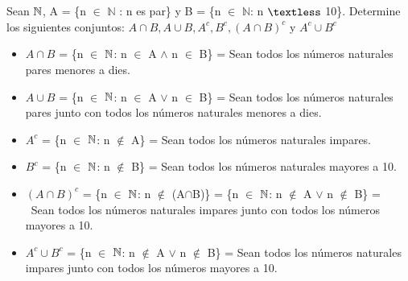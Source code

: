 \section{}
Sean $\mathbb{N}$, A = \{n $\in$ $\mathbb N$ : n es par\} y B = \{n $\in$ $\mathbb N$: n $\textless$ 10\}. Determine los siguientes conjuntos: $A \cap B, A \cup B, A^{c}, B^{c}, (A \cap B)^{c}$ y $A^{c} \cup B^{c}$\\

\begin{itemize}
\item $A \cap B$ = \{n $\in$ $\mathbb{N}$: n $\in$ A $\wedge$ n $\in$ B\} = Sean todos los números naturales pares menores a dies.
\item $A \cup B$ = \{n $\in$ $\mathbb{N}$: n $\in$ A $\vee$ n $\in$ B\} =  Sean todos los números naturales pares junto con todos los números naturales menores a dies.
\item $A^{c}$ = \{n $\in$ $\mathbb{N}$: n $\notin$ A\} = Sean todos los números naturales impares.
\item  $B^{c}$ = \{n $\in$ $\mathbb{N}$: n $\notin$ B\} = Sean todos los números naturales mayores a 10.
\item $(A \cap B)^{c}$ = \{n $\in$ $\mathbb{N}$: n $\notin$ (A$\cap$B)\} = \{n $\in$ $\mathbb{N}$: n $\notin$ A $\vee$ n $\notin$ B\} = \ Sean todos los números naturales impares junto con todos los números mayores a 10.
\item $A^{c} \cup B^{c}$ = \{n $\in$ $\mathbb{N}$: n $\notin$ A $\vee$ n $\notin$ B\} = Sean todos los números naturales impares junto con todos los números mayores a 10.
\end{itemize}